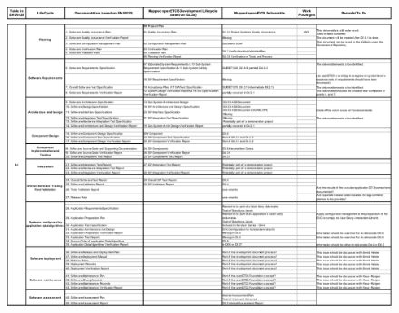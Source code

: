 \begin{figure}
\label{documentmapping} 
\centering
\includegraphics[width=21.001cm,height=16.341cm,angle=-90]{../images/documentmapping.pdf}
\end{figure}



